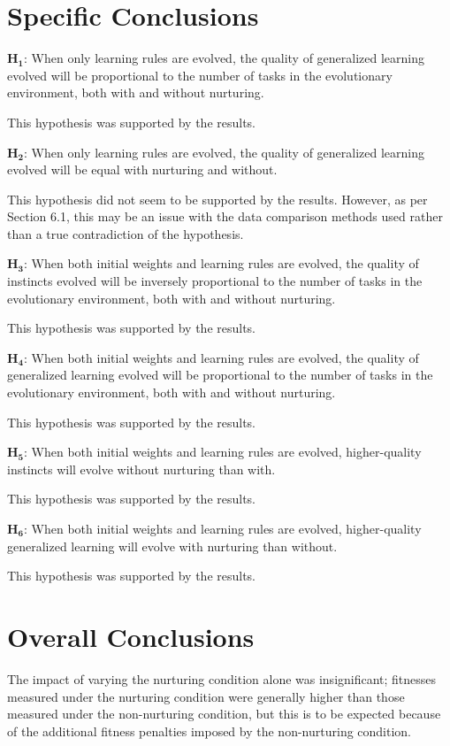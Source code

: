 \documentclass[master]{outhesis}
\begin{document}
\section{Specific Conclusions}

$\mathbf{H_1}$: When only learning rules are evolved, the quality of generalized learning evolved will be proportional to the number of tasks in the evolutionary environment, both with and without nurturing.

This hypothesis was supported by the results.

$\mathbf{H_2}$: When only learning rules are evolved, the quality of generalized learning evolved will be equal with nurturing and without.

This hypothesis did not seem to be supported by the results.
However, as per Section 6.1, this may be an issue with the data comparison methods used rather than a true contradiction of the hypothesis.

$\mathbf{H_3}$: When both initial weights and learning rules are evolved, the quality of instincts evolved will be inversely proportional to the number of tasks in the evolutionary environment, both with and without nurturing.

This hypothesis was supported by the results.

$\mathbf{H_4}$: When both initial weights and learning rules are evolved, the quality of generalized learning evolved will be proportional to the number of tasks in the evolutionary environment, both with and without nurturing.

This hypothesis was supported by the results.

$\mathbf{H_5}$: When both initial weights and learning rules are evolved, higher-quality instincts will evolve without nurturing than with.

This hypothesis was supported by the results.

$\mathbf{H_6}$: When both initial weights and learning rules are evolved, higher-quality generalized learning will evolve with nurturing than without.

This hypothesis was supported by the results.

\section{Overall Conclusions}

The impact of varying the nurturing condition alone was insignificant; 
fitnesses measured under the nurturing condition were generally higher than those measured under the non-nurturing condition, 
but this is to be expected because of the additional fitness penalties imposed by the non-nurturing condition.
\end{document}
